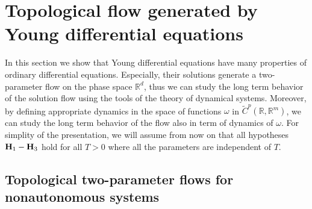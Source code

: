 \documentclass[10pt]{article}
\numberwithin{equation}{section} %
\newcommand{\R}{\ensuremath{\mathbb{R}}}
\begin{document}
\section{Topological flow generated by Young differential equations}
In this section we show that Young differential equations have many properties of ordinary differential equations. Especially, their solutions generate a two-parameter flow on the phase space $\R^d$, thus we can study the long term behavior of the solution flow using the tools of the theory of dynamical systems. Moreover, by defining appropriate dynamics in the space of  functions $\omega$ in $\widetilde{C}^{p}(\R,\R^m)$, we can study the long term behavior of the flow also in term of dynamics of $\omega$. For simplity of the presentation, we will assume from now on that all hypotheses  ${\textbf H}_1-{\textbf H}_3$ hold for all $T>0$ where all the parameters are independent of $T$.  
 
\subsection{Topological two-parameter flows for nonautonomous systems}
\end{document}
